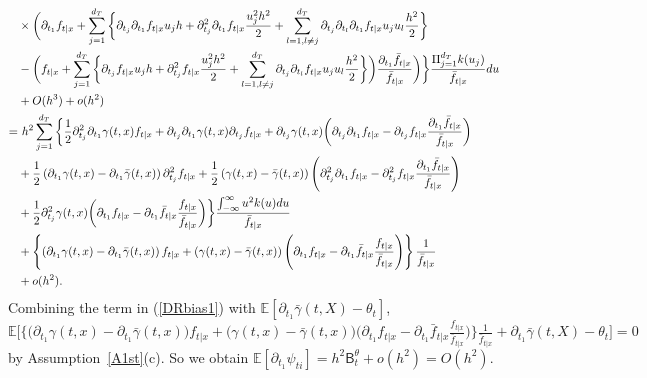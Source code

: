 \documentclass[lettersize, 12pt]{article}
\begin{document}
{\begin{align}
\notag\\
&\times\bigg( \partial_{t_1} f_{t|x} + \sum_{j=1}^{d_T} \bigg\{ 
\partial_{t_j} \partial_{t_1} f_{t|x} u_j h 
+ \partial_{t_j}^2 \partial_{t_1} f_{t|x} \frac{u_j^2h^2}{2} 
+ \sum_{l=1, l\neq j}^{d_T}\partial_{t_j}\partial_{t_l} \partial_{t_1}f_{t|x} u_j u_l \frac{h^2}{2}\bigg\}
\notag\\
&-
\bigg( f_{t|x} + \sum_{j=1}^{d_T} \bigg\{
\partial_{t_j} f_{t|x} u_j h 
+ \partial_{t_j}^2 f_{t|x} \frac{u_j^2h^2}{2}
+ \sum_{l=1, l\neq j}^{d_T}\partial_{t_j}\partial_{t_l} f_{t|x} u_j u_l \frac{h^2}{2}
\bigg\}
\bigg)
 \frac{\partial_{t_1}\bar f_{t|x} }{\bar f_{t|x}}\bigg)\bigg\}\frac{ \Pi_{j=1}^{d_T}k(u_j)}{\bar f_{t|x}} 
 du\notag \\
& 
 + O(h^3) + o(h^2)
 \notag\\
 =&\ 
 h^2   
 \sum_{j=1}^{d_T}   
 \bigg\{
 \frac{1}{2}\partial_{t_j}^2 \partial_{t_1} \gamma(t, x) f_{t|x}+ \partial_{t_j} \partial_{t_1} \gamma(t, x) \partial_{t_j}f_{t|x}
 +  \partial_{t_j} \gamma(t, x) 
\bigg( \partial_{t_j} \partial_{t_1} f_{t|x} - \partial_{t_j} f_{t|x}
 \frac{\partial_{t_1}\bar f_{t|x} }{\bar f_{t|x}}\bigg)
\notag\\& 
+ \frac{1}{2} \left(\partial_{t_1} \gamma(t,x) - \partial_{t_1}\bar \gamma(t, x)\right)  \partial_{t_j}^2 f_{t|x}
+ \frac{1}{2}  \left(\gamma(t,x) - \bar \gamma(t, x)\right)\left( \partial_{t_j}^2 \partial_{t_1} f_{t|x} 
- \partial_{t_j}^2 f_{t|x}  \frac{\partial_{t_1}\bar f_{t|x} }{\bar f_{t|x}}\right)
\notag\\
&+
\frac{1}{2} \partial_{t_j}^2 \gamma(t,x)\bigg(\partial_{t_1} f_{t|x}-  \partial_{t_1}\bar f_{t|x}\frac{f_{t|x} }{\bar f_{t|x}}\bigg)
\bigg\} \frac{\int_{-\infty}^\infty u^2 k(u)du}{\bar f_{t|x}} 
\notag\\
 &+
\left\{ \left(\partial_{t_1} \gamma(t,x) - \partial_{t_1}\bar \gamma(t, x)\right)f_{t|x} 
+\left(\gamma(t,x) - \bar \gamma(t, x)\right)\left(\partial_{t_1}f_{t|x} - \partial_{t_1}\bar f_{t|x}\frac{f_{t|x}}{\bar f_{t|x}}\right)\right\}
 \frac{1}{\bar f_{t|x}} 
\label{DRbias1} \\
 & + o(h^2). \notag
\end{align}
}
Combining the term in (\ref{DRbias1}) with $\mathbb{E}[\partial_{t_1} \bar\gamma(t,X) - \theta_t]$, 
$\mathbb{E}\Big[
\Big\{ \Big(\partial_{t_1} \gamma(t,x) - \partial_{t_1}\bar \gamma(t, x)\Big)f_{t|x} 
+\big(\gamma(t,x) - \bar \gamma(t, x)\big)\Big(\partial_{t_1}f_{t|x} - \partial_{t_1}\bar f_{t|x}\frac{f_{t|x}}{\bar f_{t|x}}\Big)\Big\}
 \frac{1}{\bar f_{t|x}} + \partial_{t_1} \bar\gamma(t,X) - \theta_t\Big] = 0$ by Assumption~\ref{A1st}(c).
So we obtain $\mathbb{E}[\partial_{t_1}\psi_{ti}] = h^2 \mathsf{B}_t^\theta + o(h^2) = O(h^2)$.  
\end{document}

